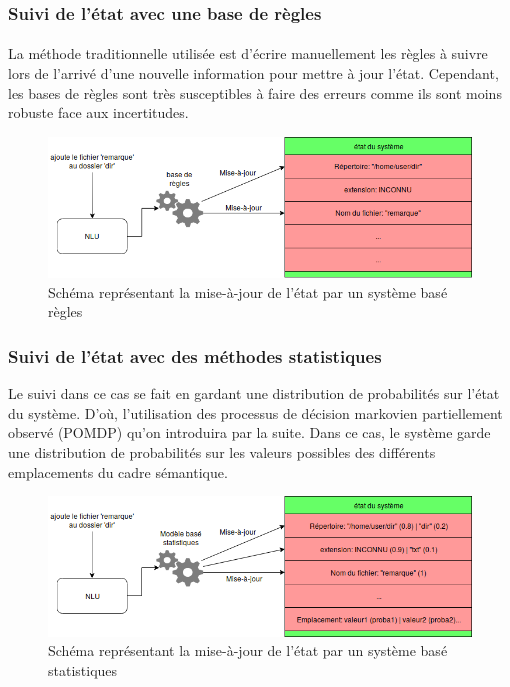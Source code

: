 \subsubsection{Suivi de l’état avec une base de règles}
\paragraph{}
La méthode traditionnelle utilisée est d’écrire manuellement les règles à suivre lors de l’arrivé d’une nouvelle information pour mettre à jour l’état\cite{Goddeau1996}. Cependant, les bases de règles sont très susceptibles à faire des erreurs\cite{Chen2017} comme ils sont moins robuste face aux incertitudes.


\begin{figure}[H]
	\centering
	\includegraphics[width=.7\linewidth]{images/DM/RuleBasedUpdate.png} 
	\caption{Schéma représentant la mise-à-jour de l'état par un système basé règles} 
\end{figure}

\subsubsection{Suivi de l’état avec des méthodes statistiques}
Le suivi dans ce cas se fait en gardant une distribution de probabilités sur l’état du système. D’où, l’utilisation des processus de décision markovien partiellement observé (POMDP)\cite{Young2010} qu’on introduira par la suite. Dans ce cas, le système garde une distribution de probabilités sur les valeurs possibles des différents emplacements du cadre sémantique.

\begin{figure}[H]
	\centering
	\includegraphics[width=.7\linewidth]{images/DM/StatBasedUpdate.png} 
	\caption{Schéma représentant la mise-à-jour de l'état par un système basé statistiques} 
\end{figure}

